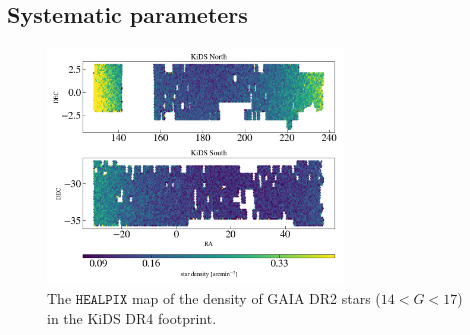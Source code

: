 \documentclass{aa}
\numberwithin{equation}{section}
\begin{document}
\subsection{Systematic parameters}

\begin{figure}
\centering
\includegraphics[width=0.7\textwidth, height = 0.5\textwidth]{figures_tmp/sys/scatter_nstar.png}
\caption{ The $\mathtt{HEALPIX}$ map of the density of GAIA DR2 stars ($14<G<17$) in the KiDS DR4 footprint.} 
\label{fig:scatter_stardens}
\end{figure}
\end{document}
